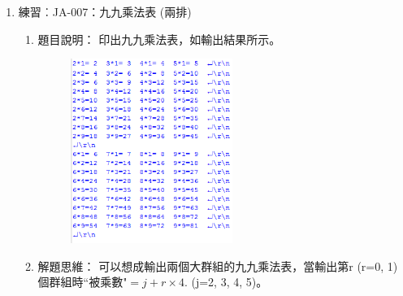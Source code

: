 \begin{enumerate}
\begin{enumerate}
\begin{cppcode}
			\end{cppcode}
		\end{enumerate}
	
	\item 練習︰JA-007：九九乘法表 (兩排)
		\begin{enumerate}
			\item 題目說明：
			\subitem 印出九九乘法表，如輸出結果所示。
			\begin{figure}[h]
				\centering
				\includegraphics[height=6cm]{fig/JA007fig}
			\end{figure}
			\item 解題思維：
			\subitem 可以想成輸出兩個大群組的九九乘法表，當輸出第r (r=0, 1) 個群組時``被乘數"$=j+r\times4.$ (j=2, 3, 4, 5)。

		\end{enumerate}
	
\end{enumerate}
